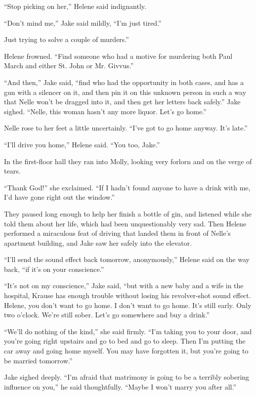 \documentclass{novel}
\begin{document}
“Stop picking on her,” Helene said indignantly.

“Don’t mind me,” Jake said mildly, “I’m just tired.”

Just trying to solve a couple of murders.”

Helene frowned. “Find someone who had a motive for murdering both Paul March and either St. John or Mr. Givvus.”

“And then,” Jake said, “find who had the opportunity in both cases, and has a gun with a silencer on it, and then pin it on this unknown person in such a way that Nelle won’t be dragged into it, and then get her letters back safely.” Jake sighed. “Nelle, this woman hasn’t any more liquor. Let’s go home.”

Nelle rose to her feet a little uncertainly. “I’ve got to go home anyway. It’s late.”

“I'll drive you home,” Helene said. “You too, Jake.”

In the first-floor hall they ran into Molly, looking very forlorn and on the verge of tears.

“Thank God!” she exclaimed. “If I hadn’t found anyone to have a drink with me, I’d have gone right out the window.”

They paused long enough to help her finish a bottle of gin, and listened while she told them about her life, which had been unquestionably very sad. Then Helene performed a miraculous feat of driving that landed them in front of Nelle’s apartment building, and Jake saw her safely into the elevator.

“I’ll send the sound effect back tomorrow, anonymously,” Helene said on the way back, “if it’s on your conscience.”

“It’s not on my conscience,” Jake said, “but with a new baby and a wife in the hospital, Krause has enough trouble without losing his revolver-shot sound effect. Helene, you don’t want to go home. I don’t want to go home. It’s still early. Only two o’clock. We’re still sober. Let’s go somewhere and buy a drink.”

“We’ll do nothing of the kind,” she said firmly. “I'm taking you to your door, and you’re going right upstairs and go to bed and go to sleep. Then I’m putting the car away and going home myself. You may have forgotten it, but you’re going to be married tomorrow.”

Jake sighed deeply. “I’m afraid that matrimony is going to be a terribly sobering influence on you,” he said thoughtfully. “Maybe I won’t marry you after all.”
\end{document}
